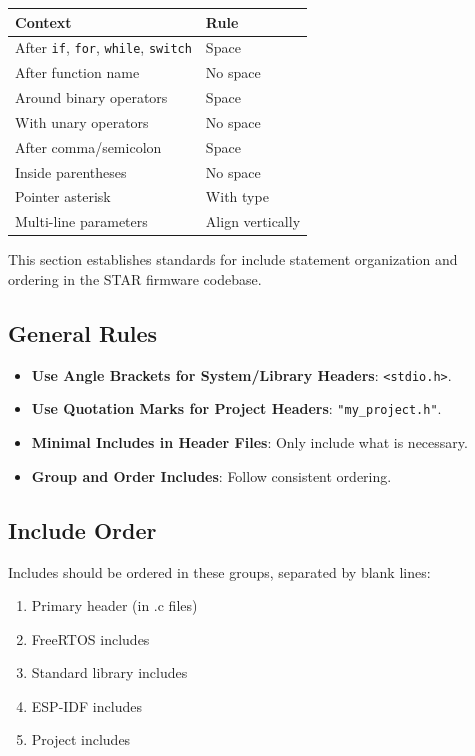 \begin{center}
\begin{tabular}{|l|l|}
\hline
\textbf{Context} & \textbf{Rule} \\
\hline
After \texttt{if}, \texttt{for}, \texttt{while}, \texttt{switch} & Space \\
\hline
After function name & No space \\
\hline
Around binary operators & Space \\
\hline
With unary operators & No space \\
\hline
After comma/semicolon & Space \\
\hline
Inside parentheses & No space \\
\hline
Pointer asterisk & With type \\
\hline
Multi-line parameters & Align vertically \\
\hline
\end{tabular}
\end{center}



This section establishes standards for include statement organization and ordering in the STAR firmware codebase.

\subsection{General Rules}

\begin{itemize}
    \item \textbf{Use Angle Brackets for System/Library Headers}: \texttt{<stdio.h>}.
    \item \textbf{Use Quotation Marks for Project Headers}: \texttt{"my\_project.h"}.
    \item \textbf{Minimal Includes in Header Files}: Only include what is necessary.
    \item \textbf{Group and Order Includes}: Follow consistent ordering.
\end{itemize}

\subsection{Include Order}

Includes should be ordered in these groups, separated by blank lines:

\begin{enumerate}
    \item Primary header (in .c files)
    \item FreeRTOS includes
    \item Standard library includes
    \item ESP-IDF includes
    \item Project includes
\end{enumerate}

